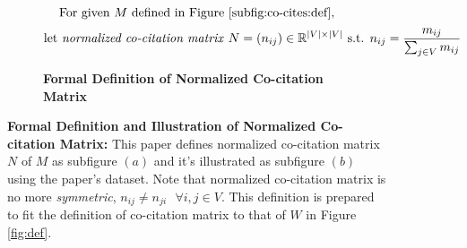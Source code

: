 \begin{figure}[]
    \begin{subfigure}[b]{1\textwidth}
        \[\text{For given $M$ defined in Figure \ref{subfig:co-cites:def},} \]
        \[\text{let \textit{normalized co-citation matrix} } N = (n_{ij}) \in \Bbb{R}^{|V| \times |V|} \text{ s.t. } n_{ij} = \frac{m_{ij}}{\sum_{j \in V}m_{ij}} \]
        \caption{\textbf{Formal Definition of Normalized Co-citation Matrix}}
        \label{subfig:co-cites:def:normal}
    \end{subfigure}
    \vfill
    \begin{subfigure}[b]{1\textwidth}
    \end{subfigure}
    \caption{\textbf{Formal Definition and Illustration of Normalized Co-citation Matrix:} This paper defines normalized co-citation matrix $N$ of $M$ as subfigure $(a)$ and it's illustrated as subfigure $(b)$ using the paper's dataset. Note that normalized co-citation matrix is no more \textit{symmetric}, $n_{ij} \neq n_{ji} \text{ } \forall i,j \in V$. This definition is prepared to fit the definition of co-citation matrix to that of $W$ in Figure \ref{fig:def}.} 
    \label{fig:def-illus-normal-co-cites}
\end{figure}